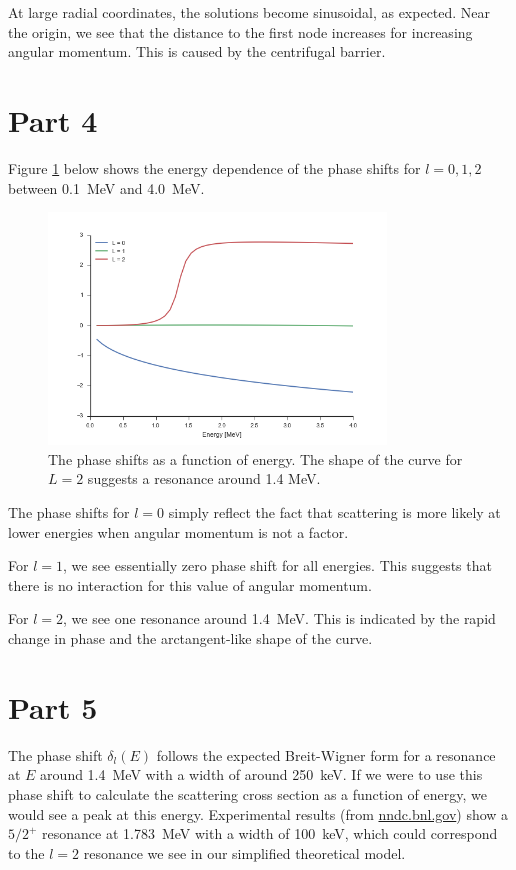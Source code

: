 \documentclass{article}
\begin{document}
At large radial coordinates, the solutions become sinusoidal, as expected. Near the origin, we see that the distance to the first node increases for increasing angular momentum. This is caused by the centrifugal barrier.


\section*{Part 4}

Figure \ref{fig:phase} below shows the energy dependence of the phase shifts for $l=0,1,2$ between \SI{0.1}{MeV} and \SI{4.0}{MeV}. 

\begin{figure}
	\centering
	\includegraphics[width=0.8\textwidth]{images/phaseshifts.png}
	\caption{The phase shifts as a function of energy. The shape of the curve for $L=2$ suggests a resonance around 1.4 MeV.}
	\label{fig:phase}
\end{figure}

The phase shifts for $l=0$ simply reflect the fact that scattering is more likely at lower energies when angular momentum is not a factor. 

For $l=1$, we see essentially zero phase shift for all energies. This suggests that there is no interaction for this value of angular momentum.

For $l=2$, we see one resonance around \SI{1.4}{MeV}. This is indicated by the rapid change in phase and the arctangent-like shape of the curve.

\section*{Part 5}

The phase shift $\delta_l(E)$ follows the expected Breit-Wigner form for a resonance at $E$ around \SI{1.4}{MeV} with a width of around \SI{250}{keV}.  If we were to use this phase shift to calculate the scattering cross section as a function of energy, we would see a peak at this energy.  Experimental results (from \url{nndc.bnl.gov}) show a $5/2^+$ resonance at \SI{1.783}{MeV} with a width of \SI{100}{keV}, which could correspond to the $l=2$ resonance we see in our simplified theoretical model.
\end{document}
